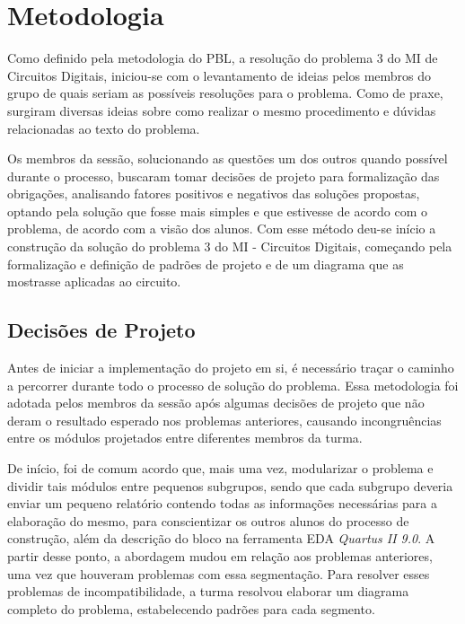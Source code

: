 \documentclass[12pt]{article}
\begin{document}

\section{Metodologia}
Como definido pela metodologia do PBL, a resolução do problema 3 do MI de Circuitos Digitais, iniciou-se com o levantamento de ideias pelos membros do grupo de quais seriam as possíveis resoluções para o problema. Como de praxe, surgiram diversas ideias sobre como realizar o mesmo procedimento e dúvidas relacionadas ao texto do problema. 

Os membros da sessão, solucionando as questões um dos outros quando possível durante o processo, buscaram tomar decisões de projeto para formalização das obrigações, analisando fatores positivos e negativos das soluções propostas, optando pela solução que fosse mais simples e que estivesse de acordo com o problema, de acordo com a visão dos alunos. Com esse método deu-se início a construção da solução do problema 3 do MI - Circuitos Digitais, começando pela formalização e definição de padrões de projeto e de um diagrama que as mostrasse aplicadas ao circuito.

\subsection{Decisões de Projeto}

Antes de iniciar a implementação do projeto em si, é necessário traçar o caminho a percorrer durante todo o processo de solução do problema. Essa metodologia foi adotada pelos membros da sessão após algumas decisões de projeto que não deram o resultado esperado nos problemas anteriores, causando incongruências entre os módulos projetados entre diferentes membros da turma. 

De início, foi de comum acordo que, mais uma vez, modularizar o problema e dividir tais módulos entre pequenos subgrupos, sendo que cada subgrupo deveria enviar um pequeno relatório contendo todas as informações necessárias para a elaboração do mesmo, para conscientizar os outros alunos do processo de construção, além da descrição do bloco na ferramenta EDA \textit{Quartus II 9.0}. A partir desse ponto, a abordagem mudou em relação aos problemas anteriores, uma vez que houveram problemas com essa segmentação. Para resolver esses problemas de incompatibilidade, a turma resolvou elaborar um diagrama completo do problema, estabelecendo padrões para cada segmento.
\end{document}
